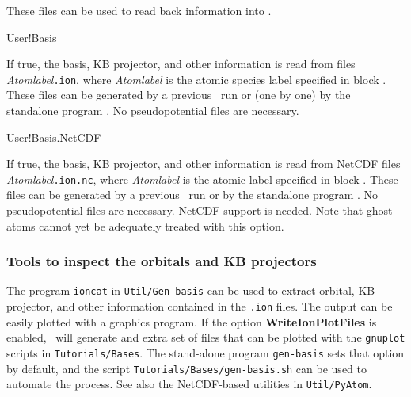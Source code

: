These files can be used to read back information into \siesta.

\begin{fdflogicalF}{User!Basis}

  If true, the basis, KB projector, and other information is read from
  files \textit{Atomlabel}\texttt{.ion}, where \textit{Atomlabel} is
  the atomic species label specified in block
  . These files can be generated by a
  previous \siesta\ run or (one by one) by the standalone program
  . No pseudopotential files are necessary.

\end{fdflogicalF}

\begin{fdflogicalF}{User!Basis.NetCDF}

  If true, the basis, KB projector, and other information is read from
  NetCDF files \textit{Atomlabel}\texttt{.ion.nc}, where
  \textit{Atomlabel} is the atomic label specified in block
  . These files can be generated by a
  previous \siesta\ run or by the standalone program
  . No pseudopotential files are necessary. NetCDF support
  is needed. Note that ghost atoms cannot yet be adequately treated
  with this option.
  
\end{fdflogicalF}



\subsubsection{Tools to inspect the orbitals and KB projectors}

The program \texttt{ioncat} in \texttt{Util/Gen-basis} can be used to
extract orbital, KB projector, and other information contained in the
\texttt{.ion} files. The output can be easily plotted with a graphics
program.  If the option \textbf{WriteIonPlotFiles} is enabled, \siesta\ 
will generate and extra set of files that can be plotted
with the \texttt{gnuplot} scripts in \texttt{Tutorials/Bases}.
The stand-alone program \texttt{gen-basis} sets that option by default, and
the script \texttt{Tutorials/Bases/gen-basis.sh} can be used to automate
the process. See also the NetCDF-based utilities in \texttt{Util/PyAtom}.

